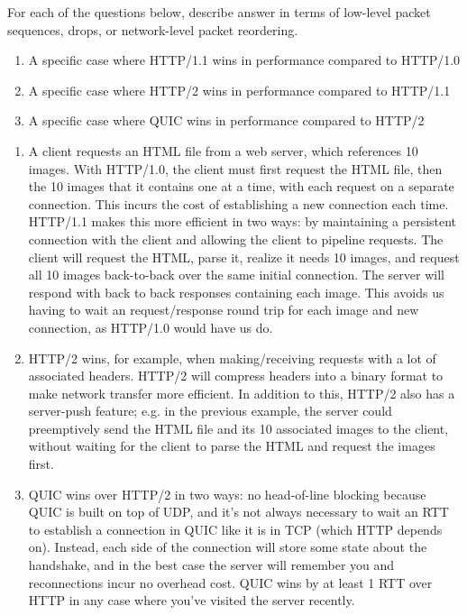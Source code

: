 \documentclass{report}
\begin{document}
\clearpage
\begin{problem}

For each of the questions below, describe answer in terms of low-level packet sequences, drops, or network-level packet reordering.

\begin{enumerate}
  
\item A specific case where HTTP/1.1 wins in performance compared to HTTP/1.0

\item A specific case where HTTP/2 wins in performance compared to HTTP/1.1
  
\item A specific case where QUIC wins in performance compared to HTTP/2

\end{enumerate}

\begin{answer}{30em}
  \begin{enumerate}
    \item A client requests an HTML file from a web server, which references 10
          images. With HTTP/1.0, the client must first request the HTML file,
          then the 10 images that it contains one at a time, with each request
          on a separate connection. This incurs the cost of establishing a new
          connection each time. HTTP/1.1 makes this more efficient in two ways:
          by maintaining a persistent connection with the client and allowing
          the client to pipeline requests. The client will request the HTML,
          parse it, realize it needs 10 images, and request all 10 images
          back-to-back over the same initial connection. The server will
          respond with back to back responses containing each image. This
          avoids us having to wait an request/response round trip for each
          image and new connection, as HTTP/1.0 would have us do.
    \item HTTP/2 wins, for example, when making/receiving requests with a lot
          of associated headers. HTTP/2 will compress headers into a binary
          format to make network transfer more efficient. In addition to this,
          HTTP/2 also has a server-push feature; e.g. in the previous example,
          the server could preemptively send the HTML file and its 10
          associated images to the client, without waiting for the client to
          parse the HTML and request the images first.
    \item QUIC wins over HTTP/2 in two ways: no head-of-line blocking because
          QUIC is built on top of UDP, and it's not always necessary to wait an
          RTT to establish a connection in QUIC like it is in TCP (which HTTP
          depends on). Instead, each side of the connection will store some
          state about the handshake, and in the best case the server will
          remember you and reconnections incur no overhead cost. QUIC wins by at
          least 1 RTT over HTTP in any case where you've visited the server
          recently.
  \end{enumerate}
\end{answer}


\end{problem}
\end{document}
